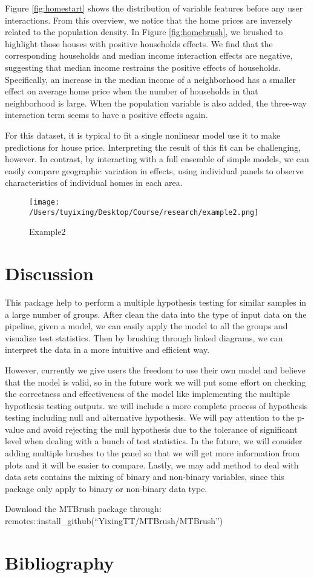 \documentclass[
]{article}
\begin{document}
Figure \ref{fig:homestart} shows the distribution of variable features
before any user interactions. From this overview, we notice that the
home prices are inversely related to the population density. In Figure
\ref{fig:homebrush}, we brushed to highlight those houses with positive
households effects. We find that the corresponding households and median
income interaction effects are negative, suggesting that median income
restrains the positive effects of households. Specifically, an increase
in the median income of a neighborhood has a smaller effect on average
home price when the number of households in that neighborhood is large.
When the population variable is also added, the three-way interaction
term seems to have a positive effects again.

For this dataset, it is typical to fit a single nonlinear model use it
to make predictions for house price. Interpreting the result of this fit
can be challenging, however. In contrast, by interacting with a full
ensemble of simple models, we can easily compare geographic variation in
effects, using individual panels to observe characteristics of
individual homes in each area.

\begin{figure}
\centering
\texttt{[image: /Users/tuyixing/Desktop/Course/research/example2.png]}
\caption{Example2}
\end{figure}

\hypertarget{discussion}{%
\section{Discussion}\label{discussion}}

This package help to perform a multiple hypothesis testing for similar
samples in a large number of groups. After clean the data into the type
of input data on the pipeline, given a model, we can easily apply the
model to all the groups and visualize test statistics. Then by brushing
through linked diagrams, we can interpret the data in a more intuitive
and efficient way.

However, currently we give users the freedom to use their own model and
believe that the model is valid, so in the future work we will put some
effort on checking the correctness and effectiveness of the model like
implementing the multiple hypothesis testing outputs. we will include a
more complete process of hypothesis testing including null and
alternative hypothesis. We will pay attention to the p-value and avoid
rejecting the null hypothesis due to the tolerance of significant level
when dealing with a bunch of test statistics. In the future, we will
consider adding multiple brushes to the panel so that we will get more
information from plots and it will be easier to compare. Lastly, we may
add method to deal with data sets contains the mixing of binary and
non-binary variables, since this package only apply to binary or
non-binary data type.

Download the MTBrush package through:
remotes::install\_github(``YixingTT/MTBrush/MTBrush'')

\hypertarget{bibliography}{%
\section{Bibliography}\label{bibliography}}
\end{document}

